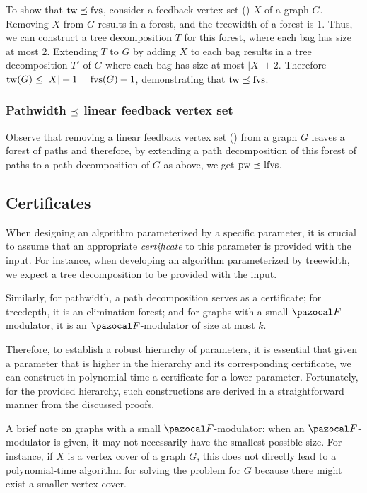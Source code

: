To show that $\text{tw} \preceq \text{fvs}$, consider a feedback vertex set (\fvs) $X$ of a graph $G$. Removing $X$ from $G$ results in a forest, and the treewidth of a forest is 1. Thus, we can construct a tree decomposition $T$ for this forest, where each bag has size at most 2. Extending $T$ to $G$ by adding $X$ to each bag results in a tree decomposition $T'$ of $G$ where each bag has size at most $|X| + 2$. Therefore $\text{tw}(G) \leq |X| + 1 = \text{fvs}(G) + 1$, demonstrating that $\text{tw} \preceq \text{fvs}$.

\subsubsection*{Pathwidth $\preceq$ linear feedback vertex set}

Observe that removing a linear feedback vertex set (\lfvs) from a graph $G$ leaves a forest of paths and therefore, by extending a path decomposition of this forest of paths to a path decomposition of $G$ as above, we get $\text{pw} \preceq \text{lfvs}$.

\subsection{Certificates}

When designing an algorithm parameterized by a specific parameter, it is crucial to assume that an appropriate \textit{certificate} to this parameter is provided with the input. For instance, when developing an algorithm parameterized by treewidth, we expect a tree decomposition to be provided with the input.

Similarly, for pathwidth, a path decomposition serves as a certificate; for treedepth, it is an elimination forest; and for graphs with a small $\F$-modulator, it is an $\F$-modulator of size at most $k$.

Therefore, to establish a robust hierarchy of parameters, it is essential that given a parameter that is higher in the hierarchy and its corresponding certificate, we can construct in polynomial time a certificate for a lower parameter. Fortunately, for the provided hierarchy, such constructions are derived in a straightforward manner from the discussed proofs.

\medskip

A brief note on graphs with a small $\F$-modulator: when an $\F$-modulator is given, it may not necessarily have the smallest possible size. For instance, if $X$ is a vertex cover of a graph $G$, this does not directly lead to a polynomial-time algorithm for solving the  problem for $G$ because there might exist a smaller vertex cover.


